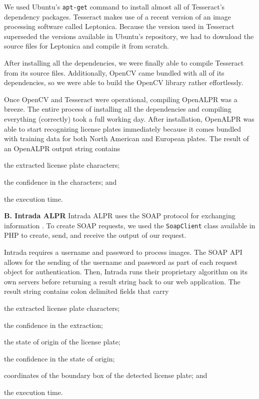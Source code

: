 \documentclass[11pt, oneside, fullpage, doublespace]{article}
\begin{document}
We used Ubuntu's \verb+apt-get+ command to install almost all of Tesseract's dependency packages. Tesseract makes use of a recent version of an image processing software called Leptonica. Because the version used in Tesseract superseded the versions available in Ubuntu's repository, we had to download the source files for Leptonica and compile it from scratch.

After installing all the dependencies, we were finally able to compile Tesseract from its source files. Additionally, OpenCV came bundled with all of its dependencies, so we were able to build the OpenCV library rather effortlessly.

Once OpenCV and Tesseract were operational, compiling OpenALPR was a breeze. The entire process of installing all the dependencies and compiling everything (correctly) took a full working day. After installation, OpenALPR was able to start recognizing license plates immediately because it comes bundled with training data for both North American and European plates. The result of an OpenALPR output string contains
\begin{inparaenum}
\item the extracted license plate characters;
\item the confidence in the characters; and
\item the execution time.
\end{inparaenum}

\textbf{B. Intrada ALPR}
Intrada ALPR uses the SOAP protocol for exchanging information \cite{soapw3c}. To create SOAP requests, we used the \verb+SoapClient+ class available in PHP to create, send, and receive the output of our request.

Intrada requires a username and password to process images. The SOAP API allows for the sending of the username and password as part of each request object for authentication. Then, Intrada runs their proprietary algorithm on its own servers before returning a result string back to our web application. The result string contains colon delimited fields that carry 
\begin{inparaenum}
\item the extracted license plate characters;
\item the confidence in the extraction;
\item the state of origin of the license plate;
\item the confidence in the state of origin;
\item coordinates of the boundary box of the detected license plate; and
\item the execution time.
\end{inparaenum}
\end{document}
